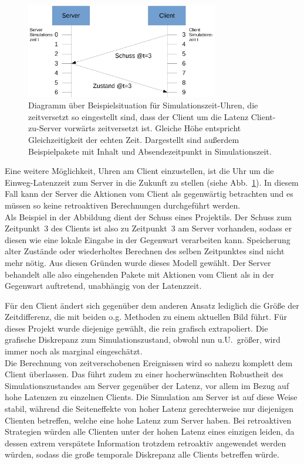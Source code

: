 \begin{figure}
    \centering
    \includegraphics[width=0.75\textwidth]{./Zeichnung2a.png}
    \caption{Diagramm über Beispielsituation für Simulationszeit-Uhren, die zeitversetzt so eingestellt sind, dass der Client um die Latenz Client-zu-Server vorwärts zeitversetzt ist. Gleiche Höhe entspricht Gleichzeitigkeit der echten Zeit. Dargestellt sind außerdem Beispielpakete mit Inhalt und Absendezeitpunkt in Simulationszeit.}
    \label{fig:zeichnung2a}
\end{figure}
Eine weitere Möglichkeit, Uhren am Client einzustellen, ist die Uhr um die Einweg-Latenzzeit zum Server in die Zukunft zu stellen (siehe Abb.~\ref{fig:zeichnung2a}). In diesem Fall kann der Server die Aktionen vom Client als gegenwärtig betrachten und es müssen so keine retroaktiven Berechnungen durchgeführt werden.\\
Als Beispiel in der Abbildung dient der Schuss eines Projektils.
Der Schuss zum Zeitpunkt~3 des Clients ist also zu Zeitpunkt~3 am Server vorhanden, sodass er diesen wie eine lokale Eingabe in der Gegenwart verarbeiten kann. Speicherung alter Zustände oder wiederholtes Berechnen des selben Zeitpunktes sind nicht mehr nötig.
Aus diesen Gründen wurde dieses Modell gewählt. Der Server behandelt alle also eingehenden Pakete mit Aktionen vom Client als in der Gegenwart auftretend, unabhängig von der Latenzzeit.

Für den Client ändert sich gegenüber dem anderen Ansatz lediglich die Größe der Zeitdifferenz, die mit beiden o.g. Methoden zu einem aktuellen Bild führt. Für dieses Projekt wurde diejenige gewählt, die rein grafisch extrapoliert. Die grafische Diskrepanz zum Simulationszustand, obwohl nun u.U.~größer, wird immer noch als marginal eingeschätzt.\\

Die Berechnung von zeitverschobenen Ereignissen wird so nahezu komplett dem Client überlassen.
Das führt zudem zu einer hocherwünschten Robustheit des Simulationszustandes am Server gegenüber der Latenz, vor allem im Bezug auf hohe Latenzen zu einzelnen Clients. Die Simulation am Server ist auf diese Weise stabil, während die Seiteneffekte von hoher Latenz gerechterweise nur diejenigen Clienten betreffen, welche eine hohe Latenz zum Server haben.
Bei retroaktiven Strategien würden alle Clienten unter der hohen Latenz eines einzigen leiden, da dessen extrem verspätete Information trotzdem retroaktiv angewendet werden würden, sodass die große temporale Diskrepanz alle Clients betreffen würde.

